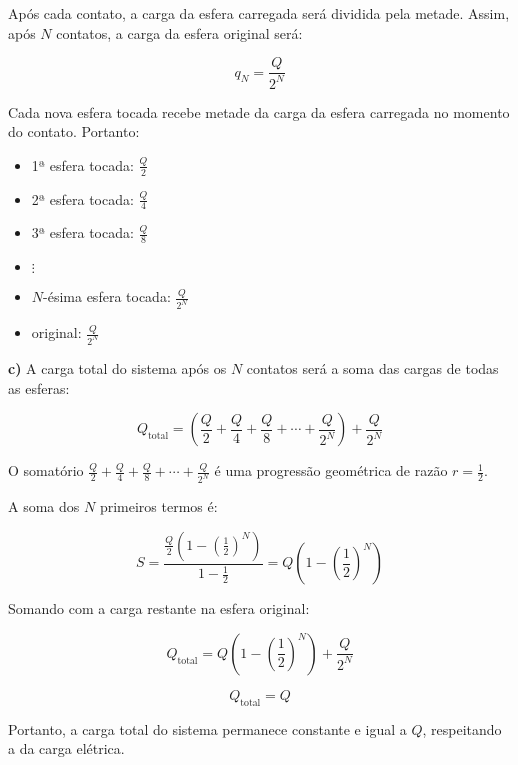 \documentclass[a4paper,12pt]{article}
\begin{document}
Após cada contato, a carga da esfera carregada será dividida pela metade. Assim, após \( N \) contatos, 
a carga da esfera original será:

\begin{equation}
q_N = \frac{Q}{2^N}
\end{equation}

Cada nova esfera tocada recebe metade da carga da esfera carregada no momento do contato. Portanto:
\begin{itemize}
    \item 1ª esfera tocada: \( \frac{Q}{2} \)
    \item 2ª esfera tocada: \( \frac{Q}{4} \)
    \item 3ª esfera tocada: \( \frac{Q}{8} \)
    \item \(\vdots\)
    \item \( N \)-ésima esfera tocada: \( \frac{Q}{2^N} \)
    \item original: \( \frac{Q}{2^N} \)
\end{itemize}

\textbf{c)}
A carga total do sistema após os \( N \) contatos será a soma das cargas de todas as esferas:

\begin{equation}
Q_{\text{total}} = \left( \frac{Q}{2} + \frac{Q}{4} + \frac{Q}{8} + \cdots + \frac{Q}{2^N} \right) + \frac{Q}{2^N}
\end{equation}

O somatório \(\frac{Q}{2} + \frac{Q}{4} + \frac{Q}{8} + \cdots + \frac{Q}{2^N}\) é uma progressão geométrica 
de razão \( r = \frac{1}{2} \).

A soma dos \( N \) primeiros termos é:

\begin{equation}
S = \frac{\frac{Q}{2} \left(1 - \left( \frac{1}{2} \right)^N\right)}{1 - \frac{1}{2}}
= Q\left(1 - \left( \frac{1}{2} \right)^N\right)
\end{equation}

Somando com a carga restante na esfera original:

\begin{equation}
Q_{\text{total}} = Q\left(1 - \left( \frac{1}{2} \right)^N\right) + \frac{Q}{2^N}
\end{equation}

\begin{equation}
Q_{\text{total}} = Q
\end{equation}

Portanto, a carga total do sistema permanece constante e igual a \( Q \), respeitando a 
da carga elétrica.
\end{document}
